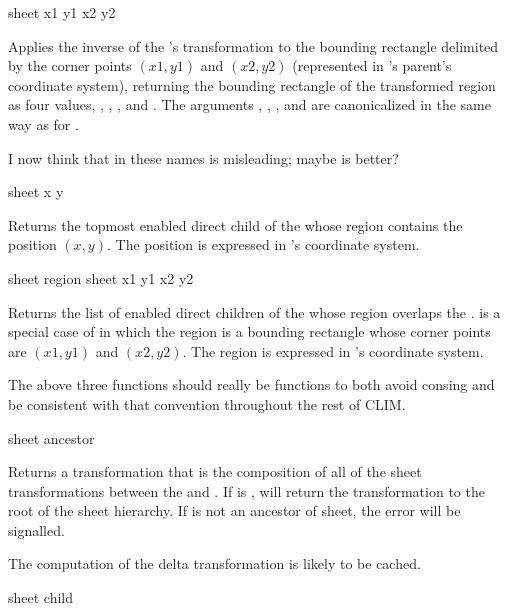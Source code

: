  {sheet x1 y1 x2 y2}

Applies the inverse of the  's transformation to the
bounding rectangle delimited by the corner points $(x1,y1)$ and $(x2,y2)$
(represented in 's parent's coordinate system), returning the
bounding rectangle of the transformed region as four values, ,
, , and .  The arguments , ,
, and  are canonicalized in the same way as for
.

 {I now think that  in these names is misleading; maybe
 is better?}

 {sheet x y}

Returns the topmost enabled direct child of the   whose
region contains the position $(x,y)$.  The position is expressed in
's coordinate system.

     {sheet region}
 {sheet x1 y1 x2 y2}

Returns the list of enabled direct children of the  
whose region overlaps the  .
 is a special case of
 in which the region is a bounding rectangle
whose corner points are $(x1,y1)$ and $(x2,y2)$.  The region is expressed in
's coordinate system.
\FreshOutputs

 {The above three functions should really be 
functions to both avoid consing and be consistent with that convention
throughout the rest of CLIM.}

 {sheet ancestor}

Returns a transformation that is the composition of all of the sheet
transformations between the   and .  If
 is ,  will return the
transformation to the root of the sheet hierarchy.  If  is not an
ancestor of sheet, the  error will be signalled.

The computation of the delta transformation is likely to be cached.

 {sheet child}

